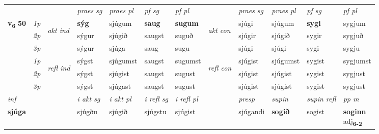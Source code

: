 \begin{longtable}[l]{X>{\footnotesize\itshape}llXXXXlXXXX}
 & &   & \textit{praes sg}  & \textit{praes pl}    & \textit{ pf sg} & \textit{pf pl} & & \textit{praes sg}  & \textit{praes pl}    & \textit{pf sg} & \textit{pf pl }  \\ \cmidrule{4-7} \cmidrule{9-12}
 \multirow{2}{*}{{{\textbf{v{\textsubscript{6}}} \Large{\textbf{50}}}}}  & 1p & \multirow{3}{*}{\begin{turn}{90}\textit{akt ind}\end{turn}} & \textbf{sýg} & sjúgum & \textbf{saug} & \textbf{sugum} & \multirow{3}{*}{\begin{turn}{90}\textit{akt con}\end{turn}} &sjúgi & sjúgum & \textbf{sygi} & sygjum\\*
 & 2p &  &  sýgur  & sjúgið & saugst & suguð & & sjúgir & sjúgið & sygir & sygjuð \\*
 & 3p &  & sýgur & sjúga & saug & sugu & & sjúgi & sjúgi& sygi & sygju \\*
\cmidrule{4-7} \cmidrule{9-12}
 & 1p & \multirow{3}{*}{\begin{turn}{90}\textit{refl ind}\end{turn}}  & sýgst & sjúgumst & saugst & sugumst & \multirow{3}{*}{\begin{turn}{90}\textit{refl con}\end{turn}}  &sjúgist & sjúgumst & sygist & sygjumst \\*
 & 2p &  & sýgst & sjúgist & saugst & sugust & &sjúgist & sjúgist & sygist & sygjust \\*
 & 3p  & & sýgst & sjúgast & saugst & sugust & & sjúgist & sjúgist& sygist & sygjust \\*
\cmidrule{4-7} \cmidrule{9-12}

   {\textit{inf}} & &  & \textit{i akt sg} & \textit{i akt pl} & \textit{i refl sg} & \textit{i refl pl} && \textit{presp} & \textit{supin} & \textit{supin refl} & \textit{pp m} \\*
  {\textbf{sjúga}} & && sjúgðu  & sjúgið & sjúgstu & sjúgist && sjúgandi &  \textbf{sogið} & sogist & \specialcell{\textbf{soginn} \\ adj\textbf{\textsubscript{6-2}}} \\*

\midrule


\end{longtable}
